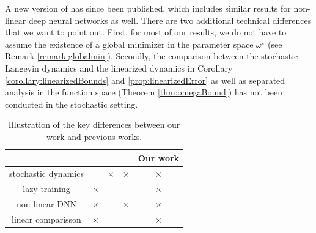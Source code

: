 \documentclass[10pt]{article} %
\begin{document}
A new version of \cite{lugosi2024convergencecontinuoustimestochasticgradient} has since been published, which includes similar results for non-linear deep neural networks as well.
There are two additional technical differences that we want to point out. First, for most of our results, we do not have to assume the existence of a global minimizer in the parameter space $\omega^\star$ (see Remark \ref{remark:globalmin}). Secondly, the comparison between the stochastic Langevin dynamics and the linearized dynamics in Corollary \ref{corollary:linearizedBounds} and \ref{prop:linearizedError} as well as separated analysis in the function space (Theorem \ref{thm:omegaBound}) has not been conducted in the stochastic setting.
\begin{table}[h]\label{table:1}
    \centering
    \begin{tabular}{|c|c|c|c|c|}
    \hline
            & \cite{ChizatBachlazyTraining}& \cite{lugosi2024convergencecontinuoustimestochasticgradient} &  \cite{lugosi2025convergencecontinuoustimestochasticgradient} &  Our work \\
            \hline
        stochastic dynamics & & $\times$ & $\times$ & $\times$\\
         lazy training & $\times$ & & & $\times$  \\
         non-linear DNN & $\times$ & & $\times$ & $\times$ \\
         linear comparisson & $\times$ & & & $\times$ \\
         \hline
    \end{tabular}
    \caption{Illustration of the key differences between our work and previous works.}
    \label{tab:placeholder}
\end{table}
\end{document}
